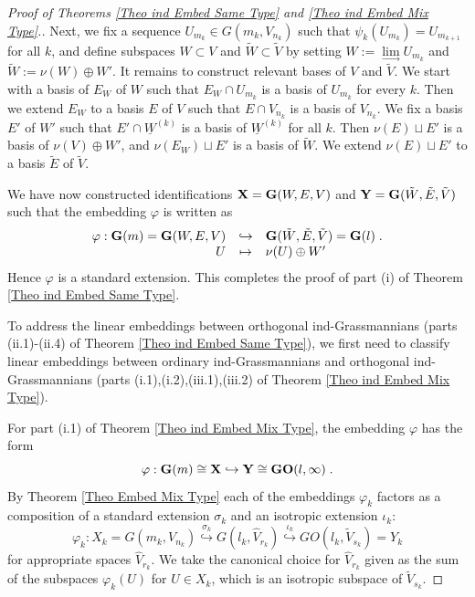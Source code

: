 \documentclass[12pt]{amsart}
\def\hw  {\hookrightarrow}
\def\ul  {\underline}
\begin{document}
\begin{proof}[Proof of Theorems \ref{Theo ind Embed Same Type} and \ref{Theo ind Embed Mix Type}.]
Next, we fix a sequence $U_{m_k}\in G(m_k,V_{n_k})$ such that $\psi_k(U_{m_k}) = U_{m_{k+1}}$ for all $k$, and define subspaces $W\subset V$ and $\tilde W\subset \tilde V$ by setting $W:=\lim\limits_{\to} U_{m_k}$ and $\tilde W:=\nu(W)\oplus W'$. It remains to construct relevant bases of $V$ and $\tilde V$. We start with a basis of $E_W$ of $W$ such that $E_W\cap U_{m_k}$ is a basis of $U_{m_k}$ for every $k$. Then we extend $E_W$ to a basis $E$ of $V$ such that $E\cap V_{n_k}$ is a basis of $V_{n_k}$. We fix a basis $E'$ of $W'$ such that $E'\cap \ul{W}^{(k)}$ is a basis of $\ul{W}^{(k)}$ for all $k$. Then $\nu(E)\sqcup E'$ is a basis of $\nu(V)\oplus W'$, and $\nu(E_W)\sqcup E'$ is a basis of $\tilde W$. We extend $\nu(E)\sqcup E'$ to a basis $\tilde E$ of $\tilde V$.

We have now constructed identifications ${\bf X}={\bf G}(W,E,V)$ and ${\bf Y}= {\bf G}(\tilde W,\tilde E,\tilde V)$ such that the embedding $\varphi$ is written as
\begin{gather}\label{For ind standard ext in proof}
\begin{array}{rcl}
\varphi: {\bf G}(m)= {\bf G}(W,E,V) & \hw & {\bf G}(\tilde W,\tilde E,\tilde V)= {\bf G}(l)\;.\\
 U & \mapsto & \nu(U)\oplus W'
\end{array}
\end{gather}
Hence $\varphi$ is a standard extension. This completes the proof of part (i) of Theorem \ref{Theo ind Embed Same Type}.

To address the linear embeddings between orthogonal ind-Grassmannians (parts (ii.1)-(ii.4) of Theorem \ref{Theo ind Embed Same Type}), we first need to classify linear embeddings between ordinary ind-Grassmannians and orthogonal ind-Grassmannians (parts (i.1),(i.2),(iii.1),(iii.2) of Theorem \ref{Theo ind Embed Mix Type}). 

For part (i.1) of Theorem \ref{Theo ind Embed Mix Type}, the embedding $\varphi$ has the form
$$
\varphi:{\bf G}(m)\cong {\bf X}\hw {\bf Y}\cong {\bf GO}(l,\infty) \;.
$$
By Theorem \ref{Theo Embed Mix Type} each of the embeddings $\varphi_k$ factors as a composition of a standard extension $\sigma_k$ and an isotropic extension $\iota_k$:
$$
\varphi_k: X_k=G(m_k,V_{n_k})\stackrel{\sigma_k}{\hw} G(l_k,\hat V_{r_k}) \stackrel{\iota_k}{\hw} GO(l_k,\tilde V_{s_k})=Y_k
$$
for appropriate spaces $\hat V_{r_k}$. We take the canonical choice for $\hat V_{r_k}$ given as the sum of the subspaces $\varphi_k(U)$ for $U\in X_k$, which is an isotropic subspace of $\tilde V_{s_k}$.


\end{proof}
\end{document}
